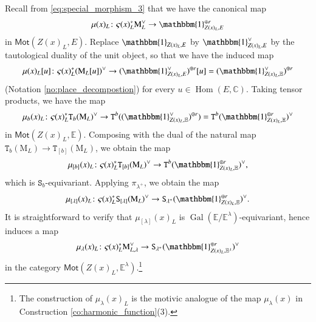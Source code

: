 \documentclass[12pt]{amsart}
\numberwithin{equation}{section}
\theoremstyle{plain}
\theoremstyle{definition}
\theoremstyle{remark}
\renewcommand{\d}[1]{\mathbb{#1}}
\renewcommand{\r}[1]{\mathrm{#1}}
\renewcommand{\sf}[1]{\mathsf{#1}}
\renewcommand{\(}{\left(}
\renewcommand{\)}{\right)}
\newcommand{\dC}{\d C}
\newcommand{\dE}{\d E}
\newcommand{\rM}{\r M}
\newcommand{\tS}{\mathtt{S}}
\newcommand{\tT}{\mathtt{T}}
\newcommand{\Mot}{\sf{Mot}}
\DeclareMathOperator{\Gal}{Gal}
\DeclareMathOperator{\Hom}{Hom}
\begin{document}
Recall from \eqref{eq:special_morphism_3} that we have the canonical map
\[
\mu(x)_L\colon\varsigma(x)_L^*\rM_L^\vee\to\mathbbm{1}_{Z(x)_L,E}^{\oplus r}
\]
in $\Mot(Z(x)_L,E)$. Replace $\mathbbm{1}_{Z(x)_L,E}$ by $\mathbbm{1}_{Z(x)_L,E}^\vee$ by the tautological duality of the unit object, so that we have the induced map
\[
\mu(x)_L[u]\colon\varsigma(x)_L^*(\rM_L[u])^\vee\to(\mathbbm{1}_{Z(x)_L,E}^\vee)^{\oplus r}[u]=(\mathbbm{1}_{Z(x)_L,\dE}^\vee)^{\oplus r}
\]
(Notation \ref{no:place_decompostion}) for every $u\in\Hom(E,\dC)$. Taking tensor products, we have the map
\[
\mu_b(x)_L\colon\varsigma(x)_L^*\tT_b(\rM_L)^\vee\to\tT^b((\mathbbm{1}_{Z(x)_L,\dE}^\vee)^{\oplus r})
=\tT^b(\mathbbm{1}_{Z(x)_L,\dE}^{\oplus r})^\vee
\]
in $\Mot(Z(x)_L,\dE)$. Composing with the dual of the natural map $\tT_b(\rM_L)\to\tT_{[b]}(\rM_L)$, we obtain the map
\[
\mu_{[b]}(x)_L\colon\varsigma(x)_L^*\tT_{[b]}(\rM_L)^\vee\to\tT^b(\mathbbm{1}_{Z(x)_L,\dE}^{\oplus r})^\vee,
\]
which is $\tS_b$-equivariant. Applying $\pi_{\lambda^+}$, we obtain the map
\begin{align*}
\mu_{[\lambda]}(x)_L\colon\varsigma(x)_L^*\tS_{[\lambda]}(\rM_L)^\vee\to\tS_{\lambda^+}(\mathbbm{1}_{Z(x)_L,\dE}^{\oplus r})^\vee.
\end{align*}
It is straightforward to verify that $\mu_{[\lambda]}(x)_L$ is $\Gal(\dE/\dE^\lambda)$-equivariant, hence induces a map
\begin{align*}
\mu_\lambda(x)_L\colon\varsigma(x)_L^*\rM_{L,\lambda}^\vee\to\tS_{\lambda^+}(\mathbbm{1}_{Z(x)_L,\dE^\lambda}^{\oplus r})^\vee
\end{align*}
in the category $\Mot(Z(x)_L,\dE^\lambda)$.\footnote{The construction of $\mu_\lambda(x)_L$ is the motivic analogue of the map $\mu_\lambda(x)$ in Construction \ref{co:harmonic_function}(3).}
\end{document}
